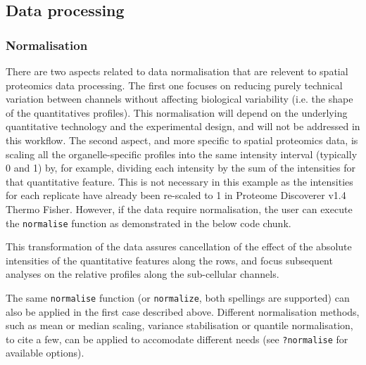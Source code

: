 \subsection*{Data processing}

\subsubsection*{Normalisation}

There are two aspects related to data normalisation that are relevent
to spatial proteomics data processing. The first one focuses on
reducing purely technical variation between channels without affecting
biological variability (i.e. the shape of the quantitatives
profiles). This normalisation will depend on the underlying
quantitative technology and the experimental design, and will not be
addressed in this workflow. The second aspect, and more specific to
spatial proteomics data, is scaling all the organelle-specific
profiles into the same intensity interval (typically 0 and 1) by, for
example, dividing each intensity by the sum of the intensities for
that quantitative feature. This is not necessary in this example as
the intensities for each replicate have already been re-scaled to 1 in
Proteome Discoverer v1.4 Thermo Fisher. However, if the data require
normalisation, the user can execute the \texttt{normalise} function as
demonstrated in the below code chunk.

\begin{knitrout}
\color{fgcolor}\begin{kframe}
\begin{alltt}
 \hlkwb{<-}   \hlstd{=} \hlstd{)}
\end{alltt}
\end{kframe}
\end{knitrout}

This transformation of the data assures cancellation of the effect of
the absolute intensities of the quantitative features along the rows,
and focus subsequent analyses on the relative profiles along the
sub-cellular channels.

The same \texttt{normalise} function (or \texttt{normalize}, both
spellings are supported) can also be applied in the first case
described above.  Different normalisation methods, such as mean or
median scaling, variance stabilisation or quantile normalisation, to
cite a few, can be applied to accomodate different needs (see
\texttt{?normalise} for available options).

